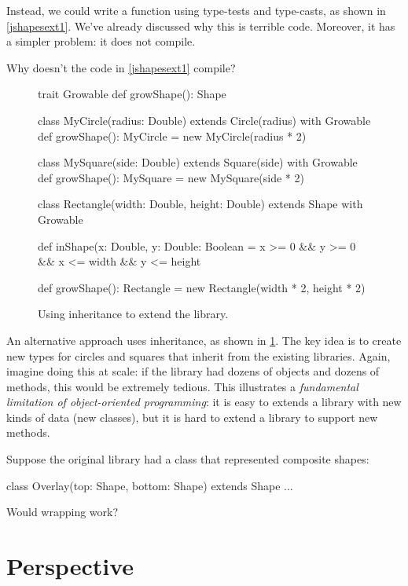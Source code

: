 \documentclass[9pt]{extbook}
\begin{document}
Instead, we could write a  function using
type-tests and type-casts, as shown in \cref{jshapesext1}. We've already
discussed why this is terrible code. Moreover, it has a simpler problem: it
does not compile.

\begin{think}
Why doesn't the code in \cref{jshapesext1} compile?
\end{think}

\begin{figure}
\begin{scalacode}
trait Growable {
  def growShape(): Shape
}

class MyCircle(radius: Double) extends Circle(radius) with Growable {
  def growShape(): MyCircle = new MyCircle(radius * 2)
}

class MySquare(side: Double) extends Square(side) with Growable {
  def growShape(): MySquare = new MySquare(side * 2)
}

class Rectangle(width: Double, height: Double) extends Shape with Growable {
  def inShape(x: Double, y: Double: Boolean = x >= 0 && y >= 0 && x <= width && y <= height

  def growShape(): Rectangle = new Rectangle(width * 2, height * 2)
}
\end{scalacode}
\caption{Using inheritance to extend the library.}
\label{jshapesext2}
\end{figure}

An alternative approach uses inheritance, as shown
in \cref{jshapesext2}. The key idea is to create  new types for circles
and squares that inherit from the existing libraries.
Again, imagine doing this at scale: if the library had dozens of objects
and dozens of methods, this would be extremely tedious.
 This illustrates a \emph{fundamental limitation of
object-oriented programming}: it is easy to extends a library with new
kinds of data (new classes), but it is hard to extend a library to support
new methods.

\begin{think}
Suppose the original library had a class that represented composite
shapes:
\begin{scalacode}
class Overlay(top: Shape, bottom: Shape) extends Shape { ... }
\end{scalacode}
Would wrapping work?
\end{think}

\section{Perspective}
\end{document}
